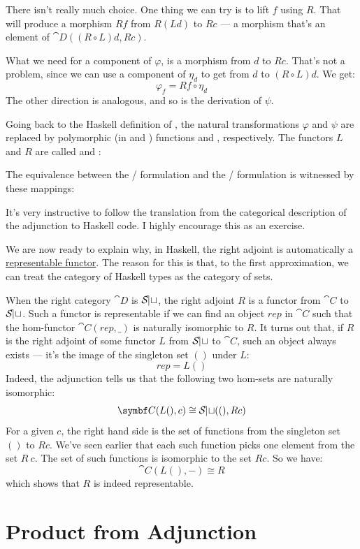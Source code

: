 There isn't really much choice. One thing we can try is to lift
$f$ using $R$. That will produce a morphism $R f$
from $R (L d)$ to $R c$ --- a morphism that's an
element of $\cat{D}((R \circ L) d, R c)$.

What we need for a component of $\varphi$, is a morphism from
$d$ to $R c$. That's not a problem, since we can use a
component of $\eta_d$ to get from $d$ to
$(R \circ L) d$. We get:
\[\varphi_f = R f \circ \eta_d\]
The other direction is analogous, and so is the derivation of $\psi$.

Going back to the Haskell definition of , the natural
transformations $\varphi$ and $\psi$ are replaced by polymorphic
(in  and ) functions  and
, respectively. The functors $L$ and
$R$ are called  and :

The equivalence between the / formulation
and the /\allowbreak{} formulation is
witnessed by these mappings:

It's very instructive to follow the translation from the categorical
description of the adjunction to Haskell code. I highly encourage this
as an exercise.

We are now ready to explain why, in Haskell, the right adjoint is
automatically a \hyperref[representable-functors]{representable
functor}. The reason for this is that, to the first approximation, we
can treat the category of Haskell types as the category of sets.

When the right category $\cat{D}$ is $\mathcal{S\mkern-3mu et}$, the right adjoint
$R$ is a functor from $\cat{C}$ to $\mathcal{S\mkern-3mu et}$. Such a functor is
representable if we can find an object $rep$ in $\cat{C}$ such
that the hom-functor $\cat{C}(rep, \_)$ is naturally isomorphic to
$R$. It turns out that, if $R$ is the right adjoint of
some functor $L$ from $\mathcal{S\mkern-3mu et}$ to $\cat{C}$, such an object
always exists --- it's the image of the singleton set $()$ under
$L$:
\[rep = L ()\]
Indeed, the adjunction tells us that the following two hom-sets are
naturally isomorphic:
\[\cat{C}(L (), c) \cong \Set((), R c)\]
For a given $c$, the right hand side is the set of functions from
the singleton set $()$ to $R c$. We've seen earlier that
each such function picks one element from the set $R\ c$. The set
of such functions is isomorphic to the set $R c$. So we have:
\[\cat{C}(L (), -) \cong R\]
which shows that $R$ is indeed representable.

\section{Product from Adjunction}

